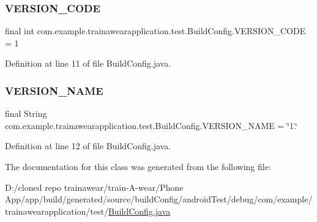 \subsubsection{\texorpdfstring{VERSION\_CODE}{VERSION\_CODE}}
{\footnotesize\ttfamily final int com.\+example.\+trainawearapplication.\+test.\+Build\+Config.\+V\+E\+R\+S\+I\+O\+N\+\_\+\+C\+O\+DE = 1\hspace{0.3cm}{\ttfamily [static]}}



Definition at line 11 of file Build\+Config.\+java.

\mbox{\label{classcom_1_1example_1_1trainawearapplication_1_1test_1_1_build_config_a5fa12283f4edf2ef20309a8a557d5614}} 
\subsubsection{\texorpdfstring{VERSION\_NAME}{VERSION\_NAME}}
{\footnotesize\ttfamily final String com.\+example.\+trainawearapplication.\+test.\+Build\+Config.\+V\+E\+R\+S\+I\+O\+N\+\_\+\+N\+A\+ME = \char`\"{}1.\char`\"{}\hspace{0.3cm}{\ttfamily [static]}}



Definition at line 12 of file Build\+Config.\+java.



The documentation for this class was generated from the following file\+:\begin{DoxyCompactItemize}
\item 
D\+:/cloned repo trainawear/train-\/\+A-\/wear/\+Phone App/app/build/generated/source/build\+Config/android\+Test/debug/com/example/trainawearapplication/test/\mbox{\hyperlink{android_test_2debug_2com_2example_2trainawearapplication_2test_2_build_config_8java}{Build\+Config.\+java}}\end{DoxyCompactItemize}

